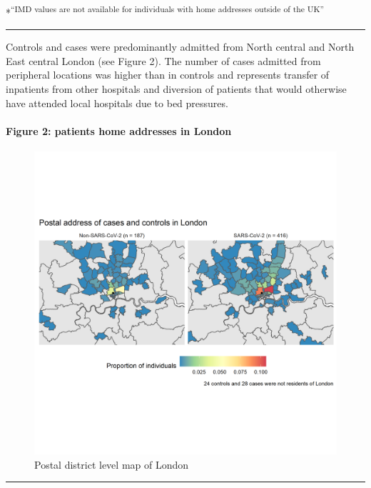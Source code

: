 \documentclass[
]{article}
\begin{document}
*\textsuperscript{``IMD values are not available for individuals with
home addresses outside of the UK''}

\begin{center}\rule{0.5\linewidth}{0.5pt}\end{center}

Controls and cases were predominantly admitted from North central and
North East central London (see Figure 2). The number of cases admitted
from peripheral locations was higher than in controls and represents
transfer of inpatients from other hospitals and diversion of patients
that would otherwise have attended local hospitals due to bed pressures.

\hypertarget{figure-2-patients-home-addresses-in-london}{%
\paragraph{Figure 2: patients home addresses in
London}\label{figure-2-patients-home-addresses-in-london}}

\begin{figure}
\centering
\includegraphics{figures/higher_level_map.png}
\caption{Postal district level map of London}
\end{figure}

\begin{center}\rule{0.5\linewidth}{0.5pt}\end{center}
\end{document}
